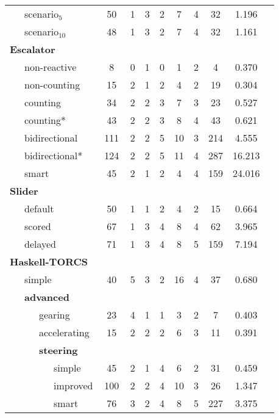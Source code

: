 \begin{table}[htbp]
\begin{tabular}{|l||c|c|c|c|c||c|c|c|c|}
\ \ \ scenario\hspace{0.5pt}$_{5} $ & 50 & 1 & 3 & 2 & 7 & 4 & 32 & 1.196 \\ %
\ \ \ scenario\hspace{0.5pt}$_{10} $ & 48 & 1 & 3 & 2 & 7 & 4 & 32 & 1.161 \\ %
\hline
\textbf{Escalator} &&&&&&&& \\
\ \ \ non-reactive & 8 & 0 & 1 & 0 & 1 & 2 & 4 & 0.370 \\ %
\ \ \ non-counting & 15 & 2 & 1 & 2 & 4 & 2 & 19 & 0.304 \\ %
\ \ \ counting & 34 & 2 & 2 & 3 & 7 & 3 & 23 & 0.527 \\ %
\ \ \ counting* & 43 & 2 & 2 & 3 & 8 & 4 & 43 & 0.621 \\ %
\ \ \ bidirectional & 111 & 2 & 2 & 5 & 10 & 3 & 214 & 4.555 \\ %
\ \ \ bidirectional* &\,124\,& 2 & 2 & 5 & 11 & 4 & 287 & 16.213 \\ %
\ \ \ smart & 45 & 2 & 1 & 2 & 4 & 4 & 159 & 24.016 \\ %
\hline
\textbf{Slider} &&&&&&&& \\
\ \ \ default & 50 & 1 &  1 & 2 & 4 & 2 & 15 & 0.664 \\ %
\ \ \ scored & 67 & 1 & 3 & 4 & 8 & 4 & 62 & 3.965 \\ %
\ \ \ delayed & 71 & 1 & 3 & 4 & 8 & 5 & 159 & 7.194 \\ %
\hline
  \textbf{Haskell-TORCS}  &&&&&&&& \\
\ \ \ simple & 40 & 5 & 3 & 2 & 16 & 4 & 37 & 0.680 \\
\ \ \ \textbf{advanced} &&&&&&&& \\[-0.2em]
\ \ \ \ \ \ gearing & 23 & 4 & 1 & 1 & 3 & 2 & 7 & 0.403 \\
\ \ \ \ \ \ accelerating & 15 & 2 & 2 & 2 & 6 & 3 & 11 & 0.391 \\
\ \ \ \ \ \ \textbf{steering} &&&&&&&& \\[-0.2em]
\ \ \ \ \ \ \ \ \ simple & 45 & 2 & 1 & 4 & 6 & 2 & 31 & 0.459 \\
\ \ \ \ \ \ \ \ \ improved & 100 & 2 & 2 & 4 & 10 & 3 & 26 & 1.347 \\
\ \ \ \ \ \ \ \ \ smart & 76 & 3 & 2 & 4 & 8 & 5 & 227 & 3.375 \\
\hline
\end{tabular}
\end{table}

